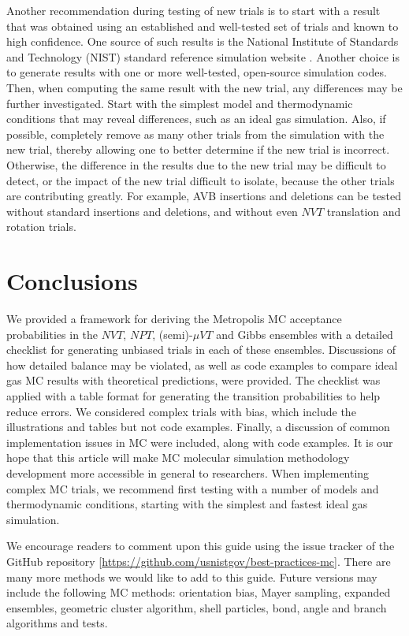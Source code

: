 \documentclass[
  9pt,
  bestpractices,
  pubversion,
]{livecoms}
\begin{document}
Another recommendation during testing of new trials is to start with a result that was obtained using an established and well-tested set of trials and known to high confidence.
One source of such results is the National Institute of Standards and Technology (NIST) standard reference simulation website \cite{shen_nist_2017}.
Another choice is to generate results with one or more well-tested, open-source simulation codes.
Then, when computing the same result with the new trial, any differences may be further investigated.
Start with the simplest model and thermodynamic conditions that may reveal differences, such as an ideal gas simulation.
Also, if possible, completely remove as many other trials from the simulation with the new trial, thereby allowing one to better determine if the new trial is incorrect.
Otherwise, the difference in the results due to the new trial may be difficult to detect, or the impact of the new trial difficult to isolate, because the other trials are contributing greatly.
For example, AVB insertions and deletions can be tested without standard insertions and deletions, and without even $NVT$ translation and rotation trials.

\section{\label{sec:conc}Conclusions}

We provided a framework for deriving the Metropolis MC acceptance probabilities in the $NVT$, $NPT$, (semi)-$\mu VT$ and Gibbs ensembles with a detailed checklist for generating unbiased trials in each of these ensembles.
Discussions of how detailed balance may be violated, as well as code examples to compare ideal gas MC results with theoretical predictions, were provided.
The checklist was applied with a table format for generating the transition probabilities to help reduce errors.
We considered complex trials with bias, which include the illustrations and tables but not code examples.
Finally, a discussion of common implementation issues in MC were included, along with code examples.
It is our hope that this article will make MC molecular simulation methodology development more accessible in general to researchers.
When implementing complex MC trials, we recommend first testing with a number of models and thermodynamic conditions, starting with the simplest and fastest ideal gas simulation.

We encourage readers to comment upon this guide using the issue tracker of the GitHub repository [\url{https://github.com/usnistgov/best-practices-mc}].
There are many more methods we would like to add to this guide.
Future versions may include the following MC methods: orientation bias, Mayer sampling, expanded ensembles, geometric cluster algorithm, shell particles, bond, angle and branch algorithms and tests.
\end{document}
